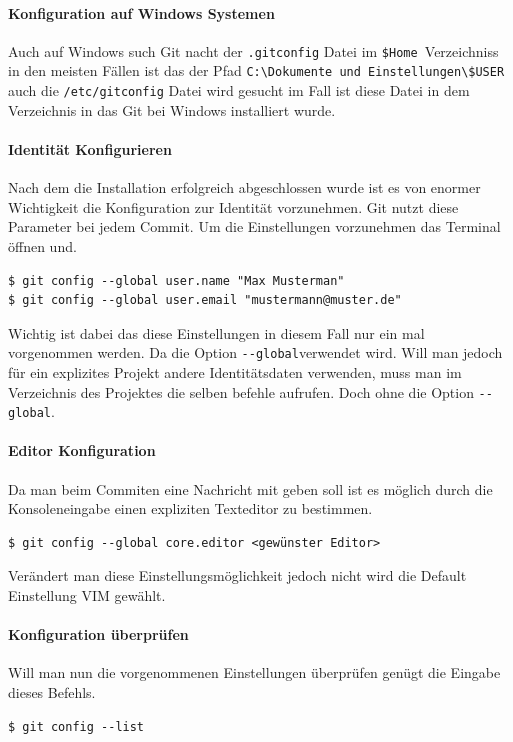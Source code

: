 \documentclass[12pt,a4paper,bibliography=totocnumbered,listof=totocnumbered]{scrartcl}
\begin{document}
\paragraph{Konfiguration auf Windows Systemen}
Auch auf Windows such Git nacht der \lstinline|.gitconfig| Datei im  \lstinline|$Home |Verzeichniss in den meisten Fällen ist das 
der Pfad \lstinline|C:\Dokumente und Einstellungen\$USER| auch die \lstinline|/etc/gitconfig| Datei wird gesucht im Fall ist diese Datei in dem Verzeichnis in das Git bei Windows installiert wurde.

\paragraph{Identität Konfigurieren}
Nach dem die Installation erfolgreich abgeschlossen wurde ist es von enormer Wichtigkeit die Konfiguration zur Identität vorzunehmen. Git nutzt diese Parameter bei jedem Commit.
Um die Einstellungen vorzunehmen das Terminal öffnen und.
\begin{lstlisting}
$ git config --global user.name "Max Musterman"
$ git config --global user.email "mustermann@muster.de"
 \end{lstlisting}
Wichtig ist dabei das diese Einstellungen in diesem Fall nur ein 
mal vorgenommen werden. Da die Option \lstinline|--global|verwendet wird. Will man jedoch für ein explizites Projekt andere Identitätsdaten verwenden, muss man im Verzeichnis des Projektes die selben befehle aufrufen. Doch ohne die Option \lstinline|--global|.
\paragraph{Editor Konfiguration}
Da man beim Commiten eine Nachricht mit geben soll  ist es möglich durch die Konsoleneingabe  einen expliziten Texteditor zu bestimmen.
\begin{lstlisting}
$ git config --global core.editor <gewünster Editor>
 \end{lstlisting}
Verändert man diese Einstellungsmöglichkeit jedoch nicht wird die Default Einstellung VIM gewählt.

\paragraph{Konfiguration überprüfen}
Will man nun die vorgenommenen Einstellungen überprüfen genügt die Eingabe dieses Befehls.
\begin{lstlisting}
$ git config --list
\end{lstlisting}
\end{document}
